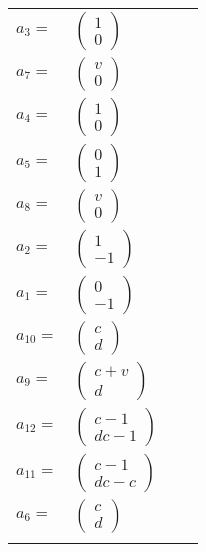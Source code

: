 \documentclass[1p]{elsarticle_modified}
\theoremstyle{definition}
\begin{document}
\begin{tabular}{m{7pt} m{180pt} m{7pt} m{180pt} }
\flushright $a_{3}=$&$\begin{pmatrix}1\\0\end{pmatrix}$ \\
\flushright $a_{7}=$&$\begin{pmatrix}v\\0\end{pmatrix}$ \\
\flushright $a_{4}=$&$\begin{pmatrix}1\\0\end{pmatrix}$ \\
\flushright $a_{5}=$&$\begin{pmatrix}0\\1\end{pmatrix}$ \\
\flushright $a_{8}=$&$\begin{pmatrix}v\\0\end{pmatrix}$ \\
\flushright $a_{2}=$&$\begin{pmatrix}1\\-1\end{pmatrix}$ \\
\flushright $a_{1}=$&$\begin{pmatrix}0\\-1\end{pmatrix}$ \\
\flushright $a_{10}=$&$\begin{pmatrix}c\\d\end{pmatrix}$ \\
\flushright $a_{9}=$&$\begin{pmatrix}c+v\\d\end{pmatrix}$ \\
\flushright $a_{12}=$&$\begin{pmatrix}c-1\\d c-1\end{pmatrix}$ \\
\flushright $a_{11}=$&$\begin{pmatrix}c-1\\d c- c\end{pmatrix}$ \\
\flushright $a_{6}=$&$\begin{pmatrix}c\\d\end{pmatrix}$\\&\end{tabular}
\end{document}
